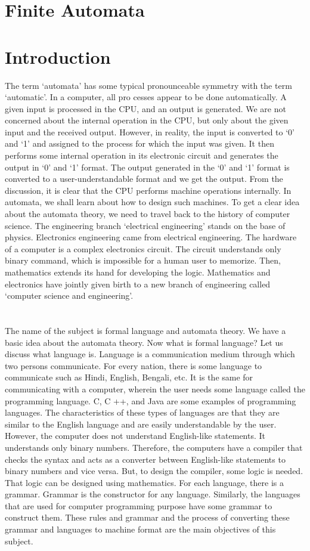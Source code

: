 \documentclass[]{article}
\begin{document}
\section{Finite Automata}
\section{Introduction}
The term ‘automata’ has some typical pronounceable symmetry with the term ‘automatic’. In a
 computer, all pro cesses appear to be done automatically. A given input is processed in the CPU, and
an output is generated. We are not concerned about the internal operation in the CPU, but only about
the given input and the received output. However, in reality, the input is converted to ‘0’ and ‘1’ and
assigned to the process for which the input was given. It then performs some internal operation in its
electronic circuit and generates the output in ‘0’ and ‘1’ format. The output generated in the ‘0’ and
‘1’ format is converted to a user-understandable format and we get the output. From the discussion, it
is clear that the CPU performs machine operations internally. In automata, we shall learn about how
to design such machines. To get a clear idea about the automata theory, we need to travel back to the
history of computer science. The engineering branch ‘electrical engineering’ stands on the base of
physics. Electronics engineering came from electrical engineering. The hardware of a computer is a
complex electronics circuit. The circuit understands only binary command, which is impossible for a
human user to memorize. Then, mathematics extends its hand for developing the logic. Mathematics
and electronics have jointly given birth to a new branch of engineering called ‘computer science and
engineering’.
\section{}
The name of the subject is formal language and automata theory. We have a basic idea about
the automata theory. Now what is formal language? Let us discuss what language is. Language is a
communication medium through which two persons communicate. For every nation, there is some
language to communicate such as Hindi, English, Bengali, etc. It is the same for communicating
with a computer, wherein the user needs some language called the programming language. C, C ++,
and Java are some examples of programming languages. The characteristics of these types of languages are that they are similar to the English language and are easily understandable by the user.
However, the computer does not understand English-like statements. It understands only binary
numbers. Therefore, the computers have a compiler that checks the syntax and acts as a converter
between English-like statements to binary numbers and vice versa. But, to design the compiler,
some logic is needed. That logic can be designed using mathematics. For each language, there is a
grammar. Grammar is the constructor for any language. Similarly, the languages that are used for
 computer programming purpose have some grammar to construct them. These rules and grammar and
the process of converting these grammar and languages to machine format are the main objectives
of this subject.
\end{document}
